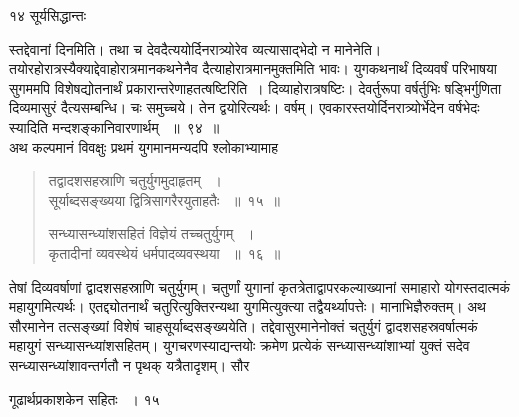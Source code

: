 \documentclass[11pt, openany]{book}
\begin{document}
\newpage


\noindent १४ \hspace{4cm} सूर्यसिद्धान्तः
\vspace{1cm}
 
\noindent स्तद्देवानां दिनमिति। तथा च देवदैत्ययोर्दिनरात्र्योरेव व्यत्यासाद्भेदो न मानेनेति। तयोरहोरात्रस्यैक्याद्देवाहोरात्रमानकथनेनैव दैत्याहोरात्रमानमुक्तमिति भावः। युगकथनार्थं दिव्यवर्षं परिभाषया सुगममपि विशेषद्योतनार्थं प्रकारान्तरेणाह\textendash तत्षष्टिरिति~। दिव्याहोरात्रषष्टिः। देवर्तुरूपा वर्षर्तुभिः षड्भिर्गुणिता दिव्यमासुरं दैत्यसम्बन्धि। चः समुच्चये। तेन द्वयोरित्यर्थः। वर्षम्। एवकारस्तयोर्दिनरात्र्योर्भेदेन वर्षभेदः स्यादिति मन्दशङ्कानिवारणार्थम् ~॥~९४~॥\\
\noindent अथ कल्पमानं विवक्षुः प्रथमं युगमानमन्यदपि श्लोकाभ्यामाह\textendash


\begin{quote}
 {\ssi तद्वादशसहस्राणि चतुर्युगमुदाहृतम् ~।\\
सूर्याब्दसङ्ख्यया द्वित्रिसागरैरयुताहतैः ~॥~१५~॥

सन्ध्यासन्ध्यांशसहितं विज्ञेयं तच्चतुर्युगम् ~।\\
कृतादीनां व्यवस्थेयं धर्मपादव्यवस्थया ~॥~१६~॥}
\end{quote}

\begin{sloppypar}
 तेषां दिव्यवर्षाणां द्वादशसहस्राणि चतुर्युगम्। चतुर्णां युगानां कृतत्रेताद्वापरकल्याख्यानां समाहारो योगस्तदात्मकं महायुगमित्यर्थः। एतद्द्योतनार्थं चतुरित्युक्तिरन्यथा युगमित्युक्त्या तद्वैयर्थ्यापत्तेः। मानाभिज्ञैरुक्तम्। अथ सौरमानेन तत्सङ्ख्यां विशेषं चाह\textendash सूर्याब्दसङ्ख्ययेति। तद्देवासुरमानेनोक्तं चतुर्युगं द्वादशसहस्रवर्षात्मकं महायुगं सन्ध्यासन्ध्यांशसहितम्। युगचरणस्याद्यन्तयोः क्रमेण प्रत्येकं सन्ध्यासन्ध्यांशाभ्यां युक्तं सदेव सन्ध्यासन्ध्यांशावन्तर्गतौ न पृथक् यत्रैतादृशम्। सौर\textendash
\end{sloppypar}

\newpage


\hspace{3cm} गूढार्थप्रकाशकेन सहितः ~।  \hfill १५
\vspace{1cm}
 
\end{document}
